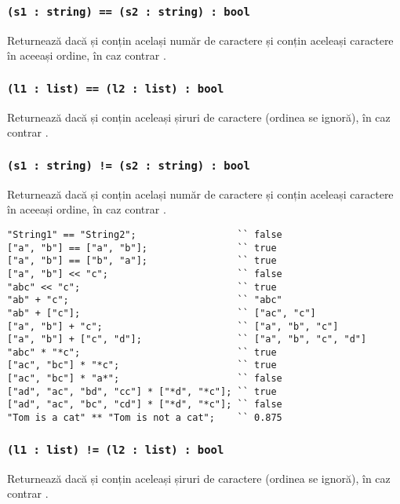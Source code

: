 \subsubsection{\lstinline|(s1 : string) == (s2 : string) : bool|}

Returnează \true{} dacă  și  conțin același număr de caractere și conțin aceleași caractere în aceeași ordine, în caz contrar \false{}.

\subsubsection{\lstinline|(l1 : list) == (l2 : list) : bool|}

Returnează \true{} dacă  și  conțin aceleași șiruri de caractere (ordinea se ignoră), în caz contrar \false{}.

\subsubsection{\lstinline`(s1 : string) != (s2 : string) : bool`}

Returnează \false{} dacă  și  conțin același număr de caractere și conțin aceleași caractere în aceeași ordine, în caz contrar \true{}.

\begin{lstlisting}[caption=Exemple de folosire al operatorilor asupra tipului string și list, label=stringlistopex]
"String1" == "String2";					 `` false
["a", "b"] == ["a", "b"];				 `` true
["a", "b"] == ["b", "a"];				 `` true
["a", "b"] << "c";						 `` false
"abc" << "c";							 `` true
"ab" + "c";								 `` "abc"
"ab" + ["c"];							 `` ["ac", "c"]
["a", "b"] + "c";						 `` ["a", "b", "c"]
["a", "b"] + ["c", "d"];				 `` ["a", "b", "c", "d"]
"abc" * "*c";							 `` true
["ac", "bc"] * "*c";					 `` true
["ac", "bc"] * "a*";					 `` false
["ad", "ac", "bd", "cc"] * ["*d", "*c"]; `` true
["ad", "ac", "bc", "cd"] * ["*d", "*c"]; `` false
"Tom is a cat" ** "Tom is not a cat";	 `` 0.875
\end{lstlisting}

\subsubsection{\lstinline|(l1 : list) != (l2 : list) : bool|}

Returnează \false{} dacă  și  conțin aceleași șiruri de caractere (ordinea se ignoră), în caz contrar \true{}.

